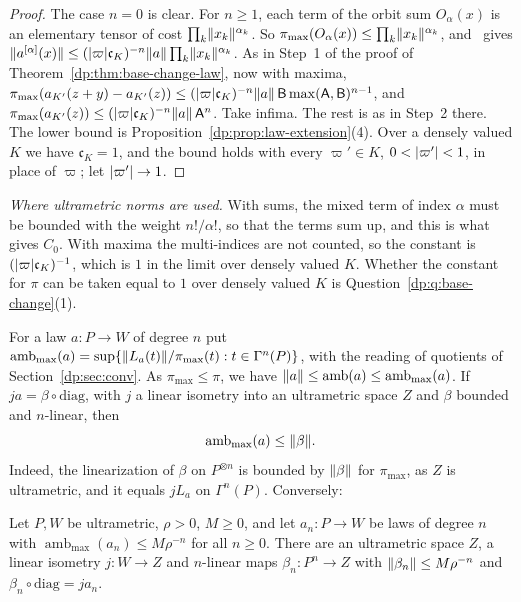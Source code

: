 \begin{proof}
The case $n=0$ is clear. For $n\ge1$, each term of the orbit sum $O_\alpha(x)$ is an elementary tensor of cost $\prod_k\lVert x_k\rVert^{\alpha_k}$. So $\pi_{\max}(O_\alpha(x))\le\prod_k\lVert x_k\rVert^{\alpha_k}$, and~\cite[Theorem~14.39(1), (14.9)]{I} gives $\lVert a^{[\alpha]}(x)\rVert\le(\lvert \varpi\rvert\mathfrak c_K)^{-n}\lVert a\rVert\prod_k\lVert x_k\rVert^{\alpha_k}$. As in Step~1 of the proof of Theorem~\ref{dp:thm:base-change-law}, now with maxima, $\pi_{\max}(a_{K'}(z+y)-a_{K'}(z))\le(\lvert \varpi\rvert\mathfrak c_K)^{-n}\lVert a\rVert\,\mathsf B\max(\mathsf A,\mathsf B)^{n-1}$, and $\pi_{\max}(a_{K'}(z))\le(\lvert \varpi\rvert\mathfrak c_K)^{-n}\lVert a\rVert\,\mathsf A^n$. Take infima. The rest is as in Step~2 there. The lower bound is Proposition~\ref{dp:prop:law-extension}(4). Over a densely valued $K$ we have $\mathfrak c_K=1$, and the bound holds with every $\varpi'\in K$, $0<\lvert \varpi'\rvert<1$, in place of $\varpi$; let $\lvert \varpi'\rvert\to1$.
\end{proof}

\emph{Where ultrametric norms are used.} With sums, the mixed term of index $\alpha$ must be bounded with the weight $n!/\alpha!$, so that the terms sum up, and this is what gives $C_0$. With maxima the multi-indices are not counted, so the constant is $(\lvert \varpi\rvert\mathfrak c_K)^{-1}$, which is $1$ in the limit over densely valued $K$. Whether the constant for $\pi$ can be taken equal to $1$ over densely valued $K$ is Question~\ref{dp:q:base-change}(1).

For a law $a\colon P\to W$ of degree $n$ put $\operatorname{amb}_{\max}(a)=\sup\{\lVert L_a(t)\rVert/\pi_{\max}(t):t\in\Gamma^n(P)\}$, with the reading of quotients of Section~\ref{dp:sec:conv}. As $\pi_{\max}\le\pi$, we have $\lVert a\rVert\le\operatorname{amb}(a)\le\operatorname{amb}_{\max}(a)$. If $ja=\beta\circ\mathrm{diag}$, with $j$ a linear isometry into an ultrametric space $Z$ and $\beta$ bounded and $n$-linear, then
\begin{equation}\label{dp:bc:amb-rep}
 \operatorname{amb}_{\max}(a)\le\lVert \beta\rVert.
\end{equation}
Indeed, the linearization of $\beta$ on $P^{\otimes n}$ is bounded by $\lVert \beta\rVert$ for $\pi_{\max}$, as $Z$ is ultrametric, and it equals $jL_a$ on $\Gamma^n(P)$. Conversely:

\begin{lemma}\label{dp:bc:envelope}
Let $P,W$ be ultrametric, $\rho>0$, $M\ge0$, and let $a_n\colon P\to W$ be laws of degree $n$ with $\operatorname{amb}_{\max}(a_n)\le M\rho^{-n}$ for all $n\ge0$. There are an ultrametric space $Z$, a linear isometry $j\colon W\to Z$ and $n$-linear maps $\beta_n\colon P^n\to Z$ with $\lVert \beta_n\rVert\le M\rho^{-n}$ and $\beta_n\circ\mathrm{diag}=ja_n$.
\end{lemma}

